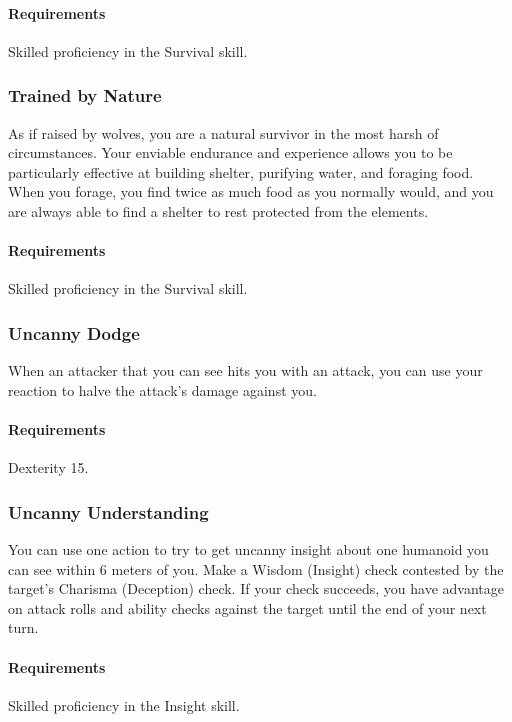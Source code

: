     \paragraph{Requirements} Skilled proficiency in the Survival skill.
\subsubsection{Trained by Nature} \label{feat::trainedbynature}
    As if raised by wolves, you are a natural survivor in the most harsh of circumstances.
    Your enviable endurance and experience allows you to be particularly effective at building shelter, purifying water, and foraging food.
    When you forage, you find twice as much food as you normally would, and you are always able to find a shelter to rest protected from the elements.
    \paragraph{Requirements} Skilled proficiency in the Survival skill.
\subsubsection{Uncanny Dodge} \label{feat::uncannydodge}
    When an attacker that you can see hits you with an attack, you can use your reaction to halve the attack's damage against you.
    \paragraph{Requirements} Dexterity 15.
\subsubsection{Uncanny Understanding} \label{feat::uncannyinsight}
    You can use one action to try to get uncanny insight about one humanoid you can see within 6 meters of you.
    Make a Wisdom (Insight) check contested by the target's Charisma (Deception) check.
    If your check succeeds, you have advantage on attack rolls and ability checks against the target until the end of your next turn.
    \paragraph{Requirements} Skilled proficiency in the Insight skill.
